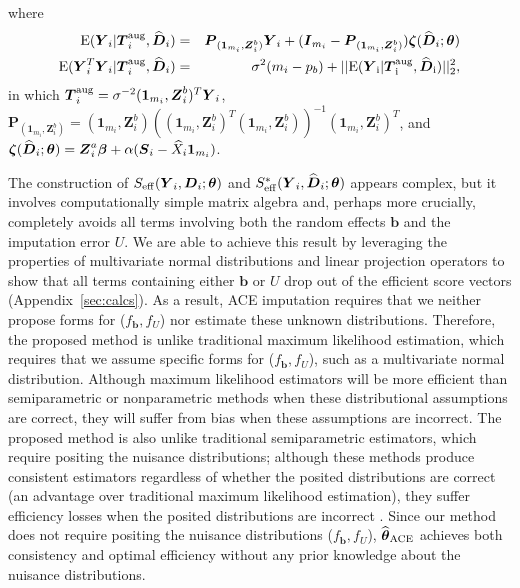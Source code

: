 \documentclass[12pt]{article}
\def\wh{\widehat}
\def\bse{\begin{eqnarray*}}
\def\ese{\end{eqnarray*}}
\def\bse{\begin{eqnarray*}}
\def\ese{\end{eqnarray*}}
\def\wh{\widehat}
\def\bS{{\mathbf S}}
\newcommand{\bzeta}{\mbox{\boldmath $\zeta$}}
\def\bbeta{{\boldsymbol{\beta}}}
\def\btheta{{\boldsymbol{\theta}}}
\def\bone{{\boldsymbol{1}}}
\def\bb{{\boldsymbol b}}
\def\bD{{\boldsymbol D}}
\def\bI{{\boldsymbol I}}
\def\bP{{\boldsymbol P}}
\def\bS{{\boldsymbol S}}
\def\bT{{\boldsymbol T}}
\def\bY{{\boldsymbol Y}}
\def\bZ{{\boldsymbol Z}}
\def\tilD{\bD}
\def\ACEest{\wh{\btheta}_{\rm ACE}}
\begin{document}
where
\bse
{\rm E}(\bY_i|\bT_i^{\rm aug},\widehat{\tilD}_i)&=&\bP_{(\bone_{m_i},\bZ^b_i)}\bY_i+(\bI_{m_i}-\bP_{(\bone_{m_i},\bZ^b_i)})\bzeta(\widehat{\tilD}_i;\btheta)\\
{\rm E}(\bY_i^T\bY_i|\bT_i^{\rm aug},\widehat{\tilD}_i)&=&\sigma^2(m_i-p_b)+||\rm{E}(\bY_i|\bT_i^{\rm aug},\widehat{\tilD}_i)||^2_2,
\ese
in which $\bT_i^{\rm aug}=\sigma^{-2}(\bone_{m_i},\bZ^b_i)^T\bY_i$, 
$\bP_{(\bone_{m_i},\bZ^b_i)}=(\bone_{m_i},\bZ^b_i)((\bone_{m_i},\bZ^b_i)^T(\bone_{m_i},\bZ^b_i))^{-1}(\bone_{m_i},\bZ^b_i)^T$,
and $\bzeta(\widehat{\tilD}_i;\btheta)=\bZ^a_i\bbeta  + \alpha(\bS_i - \widehat{X}_i\bone_{m_i})$.

The construction of $S_{\rm eff}(\bY_i,\bD_i;\btheta)$ and $S_{\rm eff}^*(\bY_i,\wh\bD_i;\btheta)$ appears complex, but it involves computationally simple matrix algebra and, perhaps more crucially, completely avoids all terms involving both the random effects $\bb$ and the imputation error $U$. We are able to achieve this result by leveraging the properties of multivariate normal distributions and linear projection operators to show that all terms containing either $\bb$ or $U$ drop out of the efficient score vectors (Appendix~\ref{sec:calcs}). As a result, ACE imputation requires that we neither propose forms for ($f_{\bb}, f_U$) nor estimate these unknown distributions. Therefore, the proposed method is unlike traditional maximum likelihood estimation, which requires that we assume specific forms for ($f_{\bb}, f_U$), such as a multivariate normal distribution. Although maximum likelihood estimators will be more efficient than semiparametric or nonparametric methods when these distributional assumptions are correct, they will suffer from bias when these assumptions are incorrect. The proposed method is also unlike traditional semiparametric estimators, which require positing the nuisance distributions; although these methods produce consistent estimators regardless of whether the posited distributions are correct (an advantage over traditional maximum likelihood estimation), they suffer efficiency losses when the posited distributions are incorrect  \citep{garcia2016optimal}. Since our method does not require positing the nuisance distributions ($f_{\bb}, f_U$), $\ACEest$ achieves both consistency and optimal efficiency without any prior knowledge about the nuisance distributions.
\end{document}
